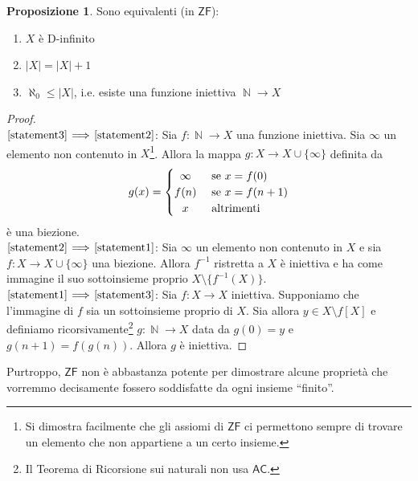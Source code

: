 \documentclass[12pt,a4paper]{report}
\theoremstyle{definition}
\newtheorem{prop}[teo]{Proposizione}  %
\theoremstyle{num.custom-title}
\DeclareMathOperator{\N}{\mathbb{N}}
\DeclareMathOperator{\sm}{\setminus}
\newcommand{\AC}{\ensuremath{\mathsf{AC}}\xspace}
\newcommand{\ZF}{\ensuremath{\mathsf{ZF}}\xspace}
\newcommand{\Implies}[2]{$\text{\ref{statement#1}}\!\implies\!\text{\ref{statement#2}}$}%
\newcommand{\punto}[1]{\item \label{statement#1}}
\newenvironment{equivalence}
    {\begin{enumerate}[label=(\arabic*),ref=(\arabic*)]
    }
    { 
	\end{enumerate}
    }
\begin{document}
\begin{prop}\label{caratt_d-fin} Sono equivalenti (in \ZF):
\begin{equivalence}
\punto{1} $X$ è D-infinito
\punto{2} $|X|=|X|+1$
\punto{3} $\aleph_0 \leq |X|$, i.e. esiste una funzione iniettiva $\N \to X$
\end{equivalence}
\begin{proof}\ \\
\Implies{3}{2}: Sia $f: \N \to X$ una funzione iniettiva. Sia $\infty$ un elemento non contenuto in $X$\footnote{Si dimostra facilmente che gli assiomi di \ZF ci permettono sempre di trovare un elemento che non appartiene a un certo insieme.}. Allora la mappa $g: X \to X \cup \{\infty\}$ definita da 
\[
g(x)=
  \begin{cases} 
      \hfill		\infty	\hfill & \text{ se $x=f(0)$} \\
      \hfill 	f(n)		\hfill & \text{ se $x=f(n+1)$} \\
      \hfill 	x		\hfill & \text{ altrimenti} \\
  \end{cases}
\]
è una biezione.\\
\Implies{2}{1}: Sia $\infty$ un elemento non contenuto in $X$ e sia $f: X \to X \cup \{\infty\}$ una biezione. Allora $f^{-1}$ ristretta a $X$ è iniettiva e ha come immagine il suo sottoinsieme proprio $X \sm \{f^{-1}(X)\}$.\\
\Implies{1}{3}: Sia $f: X \to X$ iniettiva. Supponiamo che l'immagine di $f$ sia un sottoinsieme proprio di $X$. Sia allora $y \in X \sm f[X]$ e definiamo ricorsivamente\footnote{Il Teorema di Ricorsione sui naturali non usa \AC.} $g: \N \to X$ data da $g(0)=y$ e $g(n+1)=f(g(n))$. Allora $g$ è iniettiva.
\end{proof}
\end{prop}

Purtroppo, \ZF non è abbastanza potente per dimostrare alcune proprietà che vorremmo decisamente fossero soddisfatte da ogni insieme ``finito''.
\end{document}
